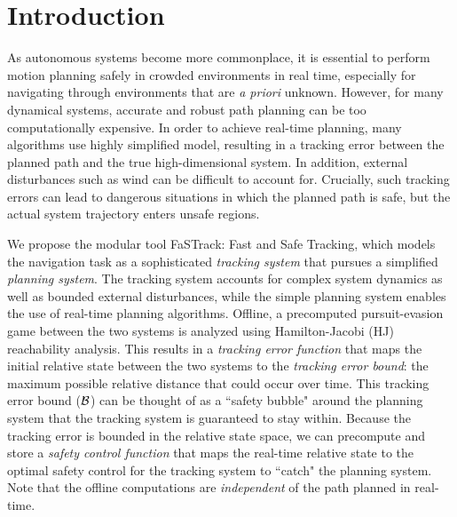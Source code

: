 \section{Introduction}
 As autonomous systems become more commonplace, it is essential to perform motion planning safely in crowded environments in real time, especially for navigating through environments that are \textit{a priori} unknown. However, for many dynamical systems, accurate and robust path planning can be too computationally expensive. In order to achieve real-time planning, many algorithms use highly simplified model, resulting in a tracking error between the planned path and the true high-dimensional system. In addition, external disturbances such as wind can be difficult to account for. Crucially, such tracking errors can lead to dangerous situations in which the planned path is safe, but the actual system trajectory enters unsafe regions.
 


We propose the modular tool FaSTrack: Fast and Safe Tracking, which models the navigation task as a sophisticated \textit{tracking system} that pursues a simplified \textit{planning system}. The tracking system accounts for complex system dynamics as well as bounded external disturbances, while the simple planning system enables the use of real-time planning algorithms. Offline, a precomputed pursuit-evasion game between the two systems is analyzed using Hamilton-Jacobi (HJ) reachability analysis. This results in a \textit{tracking error function} that maps the initial relative state between the two systems to the \textit{tracking error bound}: the maximum possible relative distance that could occur over time. This tracking error bound ($\mathcal B$) can be thought of as a ``safety bubble" around the planning system that the tracking system is guaranteed to stay within. Because the tracking error is bounded in the relative state space, we can precompute and store a \textit{safety control function} that maps the real-time relative state to the optimal safety control for the tracking system to ``catch" the planning system. Note that the offline computations are \textit{independent} of the path planned in real-time.


